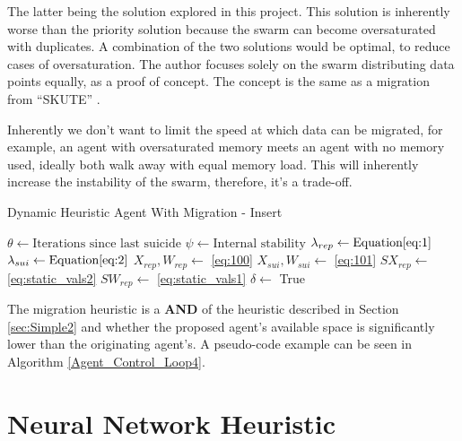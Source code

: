 \documentclass{UoYCSproject}
\begin{document}
The latter being the solution explored in this project.
This solution is inherently worse than the priority solution because the swarm can become oversaturated with duplicates.
A combination of the two solutions would be optimal, to reduce cases of oversaturation.
The author focuses solely on the swarm distributing data points equally, as a proof of concept.
The concept is the same as a migration from “SKUTE” \cite{Distributed Storage}.

Inherently we don’t want to limit the speed at which data can be migrated, for example, an agent with oversaturated memory meets an agent with no memory used, ideally both walk away with equal memory load.
This will inherently increase the instability of the swarm, therefore, it’s a trade-off.

\begin{algorithm}
\caption{Dynamic Heuristic Agent With Migration - Insert}
\label{Agent_Control_Loop4}
\begin{algorithmic}[1]
\State $\theta \gets \text{Iterations since last suicide}$
\State $\psi \gets \text{Internal stability}$
\State $\lambda_{rep} \gets \text{Equation} \ref{eq:1}$
\State $\lambda_{sui} \gets \text{Equation} \ref{eq:2}$
\State $X_{rep}, W_{rep} \gets $ \ref{eq:100}
\State $X_{sui}, W_{sui} \gets $ \ref{eq:101}
\State
\State $SX_{rep} \gets $ \ref{eq:static_vals2}
\State $SW_{rep} \gets $ \ref{eq:static_vals1}
\State
\State $\delta \gets$ 
\State
{}
\State {}
\State
{}
\State {}
\State \Return True
\EndIf
\EndIf
\end{algorithmic}
\end{algorithm}

The migration heuristic is a \textbf{AND} of the heuristic described in Section \ref{sec:Simple2} and whether the proposed agent's available space is significantly lower than the originating agent’s.
A pseudo-code example can be seen in Algorithm \ref{Agent_Control_Loop4}.


\section{Neural Network Heuristic}
\label{sec:Simple5}
\end{document}
